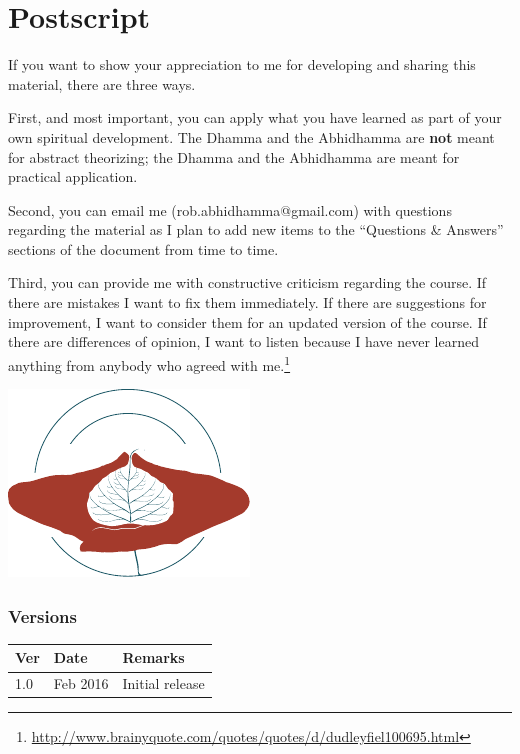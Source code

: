 \section{Postscript}

If you want to show your appreciation to me for developing and sharing this material, there are three ways.

First, and most important, you can apply what you have learned as part of your own spiritual development. The Dhamma and the Abhidhamma are \textbf{not} meant for abstract theorizing; the Dhamma and the Abhidhamma are meant for practical application.

Second, you can email me (rob.abhidhamma@gmail.com) with questions regarding the material as I plan to add new items to the “Questions \& Answers” sections of the document from time to time.

Third, you can provide me with constructive criticism regarding the course. If there are mistakes I want to fix them immediately. If there are suggestions for improvement, I want to consider them for an updated version of the course. If there are differences of opinion, I want to listen because I have never learned anything from anybody who agreed with me.\footnote{\url{http://www.brainyquote.com/quotes/quotes/d/dudleyfiel100695.html}}
\\

\begin{center}
\includegraphics[width=0.6\linewidth]{./Diagrams/Back}
\end{center}

\vspace{10mm}
\subsubsection*{Versions}
\begin{tabular*}{\textwidth}{lll}
\toprule
\textbf{Ver} & \textbf{Date} & \textbf{Remarks} \\ 
\midrule
1.0 & Feb 2016 & Initial release \\ 
\bottomrule
\end{tabular*} 

